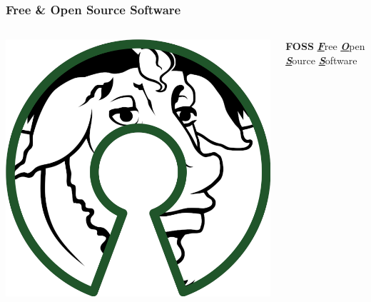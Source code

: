
\begin{frame}
  \frametitle{Free \& Open Source Software}
  \begin{columns}

    \begin{center}
      \includegraphics[width=.7\linewidth]{images/foss-logo.png}
    \end{center}

    \begin{beamerboxesrounded}[shadow=true,width=.9\textwidth]{\bfseries FOSS}
      \centering \Large \underline{\slshape \bfseries F}ree  %
      \underline{\slshape \bfseries O}pen %
      \underline{\slshape \bfseries S}ource %
      \underline{\slshape \bfseries S}oftware
    \end{beamerboxesrounded}
  \end{columns}

\end{frame}
